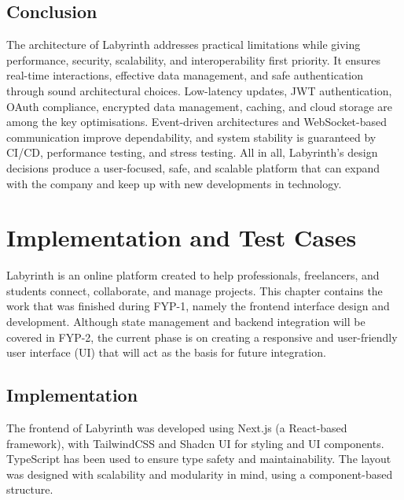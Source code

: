 \documentclass{FastFyp}
\begin{document}
\section{Conclusion}
The architecture of Labyrinth addresses practical limitations while giving performance, security, scalability, and interoperability first priority.  It ensures real-time interactions, effective data management, and safe authentication through sound architectural choices.  Low-latency updates, JWT authentication, OAuth compliance, encrypted data management, caching, and cloud storage are among the key optimisations.  Event-driven architectures and WebSocket-based communication improve dependability, and system stability is guaranteed by CI/CD, performance testing, and stress testing.  All in all, Labyrinth's design decisions produce a user-focused, safe, and scalable platform that can expand with the company and keep up with new developments in technology.

\chapter{Implementation and Test Cases}
Labyrinth is an online platform created to help professionals, freelancers, and students connect, collaborate, and manage projects.  This chapter contains the work that was finished during FYP-1, namely the frontend interface design and development.  Although state management and backend integration will be covered in FYP-2, the current phase is on creating a responsive and user-friendly user interface (UI) that will act as the basis for future integration.
\section{Implementation}
The frontend of Labyrinth was developed using Next.js (a React-based framework), with TailwindCSS and Shadcn UI for styling and UI components. TypeScript has been used to ensure type safety and maintainability. The layout was designed with scalability and modularity in mind, using a component-based structure.
\end{document}
